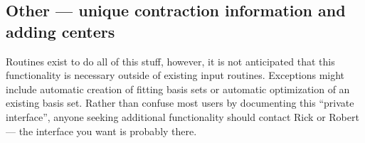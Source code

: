 \subsection{Other --- unique contraction information and adding
centers}

Routines exist to do all of this stuff, however, it is not anticipated
that this functionality is necessary outside of existing input
routines.  Exceptions might include automatic creation of fitting
basis sets or automatic optimization of an existing basis set.
Rather than confuse most users by documenting this ``private
interface'', anyone seeking additional functionality should contact
Rick or Robert --- the interface you want is probably there.

